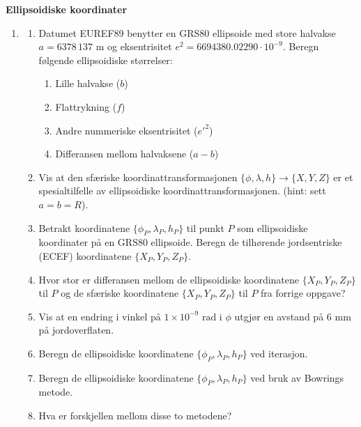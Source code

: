 \documentclass[11pt,a4paper]{article}
\begin{document}
\newpage

{\noindent\large\textbf{Ellipsoidiske koordinater}}

\vspace{0.3cm}
\begin{enumerate}
    \item[2.] 
    \begin{enumerate}
        \item Datumet EUREF89 benytter en GRS80 ellipsoide med store halvakse $a = 6378\,137\text{ m}$ og eksentrisitet $e^2 = 6694380.02290 \cdot 10^{-9}$. Beregn følgende ellipsoidiske størrelser:
        \begin{enumerate}
            \item[i.] Lille halvakse ($b$)
            \item[ii.] Flattrykning ($f$)
            \item[iii.] Andre nummeriske eksentrisitet ($e'^2$)
            \item[iv.] Differansen mellom halvaksene ($a - b$)
        \end{enumerate}
        \item Vis at den sfæriske koordinattransformasjonen $\{\phi, \lambda, h\} \to \{X, Y, Z\}$ er et spesialtilfelle av ellipsoidiske koordinattransformasjonen. (hint: sett $a = b = R$).
        \item Betrakt koordinatene $\{\phi_P, \lambda_P, h_P\}$ til punkt $P$ som ellipsoidiske koordinater på en GRS80 ellipsoide. Beregn de tilhørende jordsentriske (ECEF) koordinatene $\{X_P, Y_P, Z_P\}$.
        \item Hvor stor er differansen mellom de ellipsoidiske koordinatene $\{X_P, Y_P, Z_P\}$ til $P$ og de sfæriske koordinatene $\{X_P, Y_P, Z_P\}$ til $P$ fra forrige oppgave?
        \item Vis at en endring i vinkel på $1 \times 10^{-9}\text{ rad}$ i $\phi$ utgjør en avstand på $6\text{ mm}$ på jordoverflaten.
        \item Beregn de ellipsoidiske koordinatene $\{\phi_P, \lambda_P, h_P\}$ ved iterasjon.
        \item Beregn de ellipsoidiske koordinatene $\{\phi_P, \lambda_P, h_P\}$ ved bruk av Bowrings metode.
        \item Hva er forskjellen mellom disse to metodene?
    \end{enumerate}
\end{enumerate}
\end{document}
